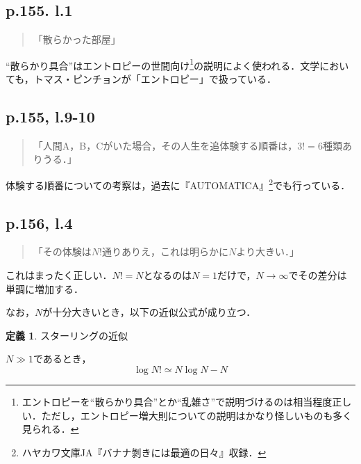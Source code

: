 \documentclass[10pt, a5paper, twoside]{jsarticle}
\theoremstyle{definition}
\newtheorem{dfn}{定義}
\begin{document}
		\subsection{p.155. l.1}

			\begin{quote}
				
				「散らかった部屋」

			\end{quote}

			“散らかり具合”はエントロピーの世間向け\footnote{エントロピーを“散らかり具合”とか“乱雑さ”で説明づけるのは相当程度正しい．ただし，エントロピー増大則についての説明はかなり怪しいものも多く見られる．}の説明によく使われる．文学においても，トマス・ピンチョンが「エントロピー」で扱っている．

		\subsection{p.155, l.9-10}

			\begin{quote}
				
				「人間A，B，Cがいた場合，その人生を追体験する順番は，$3!=6$種類ありうる．」

			\end{quote}

			体験する順番についての考察は，過去に『AUTOMATICA』\footnote{ハヤカワ文庫JA『バナナ剝きには最適の日々』収録．}でも行っている．

		\subsection{p.156, l.4}

			\begin{quote}
				
				「その体験は$N!$通りありえ，これは明らかに$N$より大きい．」

			\end{quote}

			これはまったく正しい．$N! = N$となるのは$N = 1$だけで，$N \to \infty$でその差分は単調に増加する．

			なお，$N$が十分大きいとき，以下の近似公式が成り立つ．

			\begin{dfn}
				
				スターリングの近似

				$N \gg 1$であるとき，
				$$\log{N!} \simeq N \log{N} - N$$

			\end{dfn}
\end{document}
